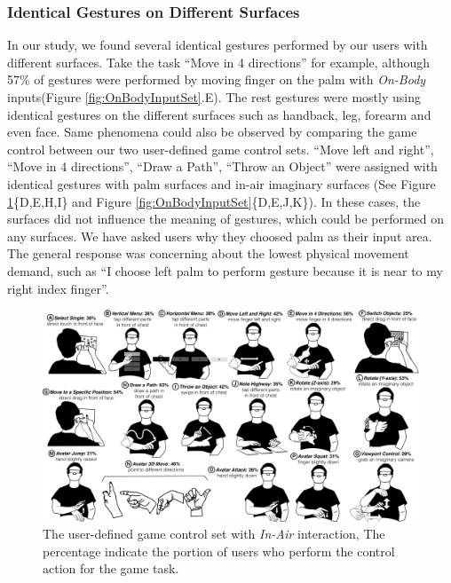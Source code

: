 \documentclass{sigchi}
\begin{document}
\subsubsection{Identical Gestures on Different Surfaces}
 In our study, we found several identical gestures performed by our users with different surfaces. Take the task ``Move in 4 directions'' for example, although 57\% of gestures were performed by moving finger on the palm with \emph{On-Body} inputs(Figure \ref{fig:OnBodyInputSet}.E). The rest gestures were mostly using identical gestures on the different surfaces such as handback, leg, forearm and even face. Same phenomena could also be observed by comparing the game control between our two user-defined game control sets. ``Move left and right'', ``Move in 4 directions'', ``Draw a Path'', ``Throw an Object'' were assigned with identical gestures with palm surfaces and in-air imaginary surfaces (See Figure \ref{fig:InAirSet}\{D,E,H,I\} and Figure \ref{fig:OnBodyInputSet}\{D,E,J,K\}). In these cases, the surfaces did not influence the meaning of gestures, which could be performed on any surfaces. We have asked users why they choosed palm as their input area. The general response was concerning about the lowest physical movement demand, such as ``I choose left palm to perform gesture because it is near to my right index finger''.


  \begin{figure}
  \centering
  \includegraphics[width=1\textwidth]{InAirSet.pdf}
  \caption{The user-defined game control set with \emph{In-Air} interaction, The percentage indicate the portion of users who perform the control action for the game task.}
  \label{fig:InAirSet}
  \end{figure}
\end{document}
